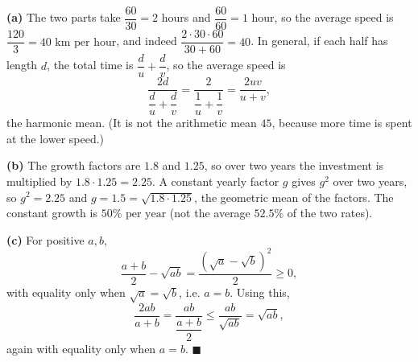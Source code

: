 \textbf{(a)} The two parts take $\dfrac{60}{30}=2$ hours and $\dfrac{60}{60}=1$ hour, so the average speed is $\dfrac{120}{3}=\boxed{40\text{ km per hour}}$, and indeed $\dfrac{2\cdot30\cdot60}{30+60}=40$. In general, if each half has length $d$, the total time is $\dfrac du+\dfrac dv$, so the average speed is
\[\dfrac{2d}{\dfrac du+\dfrac dv}=\dfrac{2}{\dfrac1u+\dfrac1v}=\dfrac{2uv}{u+v},\]
the harmonic mean. (It is not the arithmetic mean $45$, because more time is spent at the lower speed.)

\textbf{(b)} The growth factors are $1.8$ and $1.25$, so over two years the investment is multiplied by $1.8\cdot1.25=2.25$. A constant yearly factor $g$ gives $g^2$ over two years, so $g^2=2.25$ and $g=1.5=\sqrt{1.8\cdot1.25}$, the geometric mean of the factors. The constant growth is $\boxed{50\%\text{ per year}}$ (not the average $52.5\%$ of the two rates).

\textbf{(c)} For positive $a,b$,
\[\dfrac{a+b}{2}-\sqrt{ab}=\dfrac{\left(\sqrt a-\sqrt b\right)^2}{2}\ge0,\]
with equality only when $\sqrt a=\sqrt b$, i.e. $a=b$. Using this,
\[\dfrac{2ab}{a+b}=\dfrac{ab}{\dfrac{a+b}{2}}\le\dfrac{ab}{\sqrt{ab}}=\sqrt{ab},\]
again with equality only when $a=b$. $\blacksquare$
